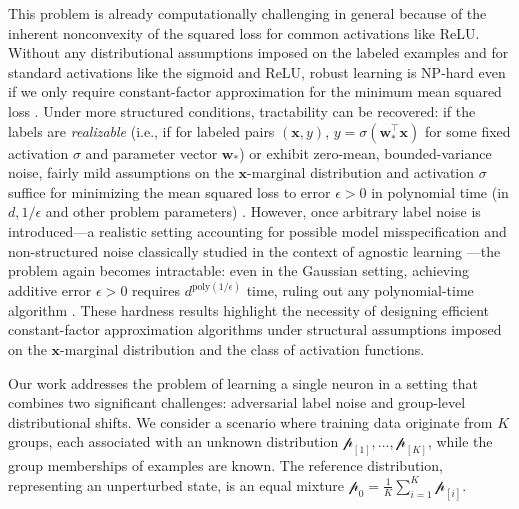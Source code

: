 \documentclass[11pt]{article}
\newcounter{thm}
\numberwithin{thm}{section}
\theoremstyle{plain}
\theoremstyle{definition}
\theoremstyle{remark} \newtheorem{remark}[thm]{Remark}
\def\vw{{\bm{w}}}
\def\vx{{\bm{x}}}
\def\pp{{\mathcal{p}}}
\begin{document}
This problem is already computationally challenging
in general because of the inherent nonconvexity of the squared loss 
for common activations like ReLU. 
Without any distributional assumptions imposed on the labeled examples and for standard activations like the sigmoid and ReLU, robust learning is NP-hard even if we only require constant-factor approximation for the minimum mean squared loss  \citep{vsima2002training,MR18}. 
Under more structured conditions, tractability can be recovered: if the labels are \emph{realizable} (i.e., if for labeled pairs $(\vx, y)$, $y = \sigma(\vw_*^\top \vx)$ for some fixed activation $\sigma$ and parameter vector $\vw_*$) or exhibit zero-mean, bounded-variance noise, fairly mild assumptions on the $\vx$-marginal distribution and activation $\sigma$ suffice for minimizing the mean squared loss to error $\epsilon > 0$ in polynomial time (in $d, 1/\epsilon$ and other problem parameters)  
\citep{kalai2009isotron,kakade2011efficient,soltanolkotabi2017learning}.
However, once arbitrary label noise is introduced---a realistic setting accounting for possible model misspecification and non-structured noise classically studied in the context of agnostic learning \citep{Haussler:92,kearns1992toward}---the problem again becomes intractable: 
even in the Gaussian setting, achieving additive error $\epsilon > 0$ 
requires $d^{\mathrm{poly}(1/\epsilon)}$ time, 
ruling out any polynomial-time algorithm 
\citep{GoelKK19,DKZ20-sq-reg,GGK20,DKPZ21-SQ,diakonikolas2023near}. 
These hardness results highlight the necessity of 
designing efficient constant-factor approximation algorithms 
under structural assumptions imposed on the $\vx$-marginal distribution and the class of activation functions.

Our work addresses the problem of learning a single neuron 
in a setting that combines two significant challenges: 
adversarial label noise and group-level distributional shifts. 
We consider a scenario where training data originate from \(K\) groups, 
each associated with an unknown distribution \(\pp_{[1]},\dots,\pp_{[K]}\), 
while the group memberships of examples are known. 
The reference distribution, representing an unperturbed state, 
is an equal mixture \(\pp_0=\tfrac1K\sum_{i=1}^K\pp_{[i]}\). 
\end{document}
